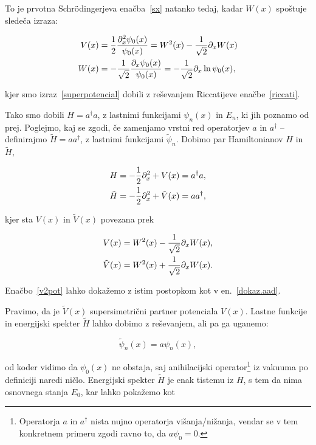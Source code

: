 \ni To je prvotna Schr\" odingerjeva ena\v cba~\eqref{sx} natanko tedaj, kadar $W (x)$ spo\v stuje slede\v ca izraza:

\begin{align}
	V(x) &=\frac{1}{2}\frac{\partial_x^2\psi_0(x)}{\psi_0(x)} = W^2(x) - \frac{1}{\sqrt{2}}\partial_x
		W(x) \label{riccati} \\
	W(x) &= -\frac{1}{\sqrt{2}}\frac{\partial_x\psi_0(x)}{\psi_0(x)} = -\frac{1}{\sqrt{2}} \partial_x \ln \psi_0 (x)\label{superpotencial},
\end{align}

\ni kjer smo izraz~\eqref{superpotencial} dobili z re\v sevanjem Riccatijeve ena\v cbe~\eqref{riccati}.

Tako smo dobili $H = a^\dagger a$, z lastnimi funkcijami $\psi_n(x)$ in $E_n$, ki jih poznamo
od prej. Poglejmo, kaj se zgodi, \v ce zamenjamo vrstni red operatorjev $a$ in $a^\dagger$ -- definirajmo $\tilde{H} = aa^\dagger$,
z lastnimi funkcijami $\tilde{\psi}_n$. Dobimo par Hamiltonianov $H$ in $\tilde{H}$,

\begin{align}
	H &= -\frac{1}{2}\partial_x^2 + V(x) = a^\dagger a, \\
	\tilde{H} &= -\frac{1}{2}\partial_x^2 + \tilde{V}(x) = aa^\dagger,
\end{align}

\ni kjer sta $V(x)$ in $\tilde{V}(x)$ povezana prek

\begin{align}
	V(x) &= W^2(x) - \frac{1}{\sqrt{2}}\partial_x W(x), \notag \\
	\tilde{V}(x) &= W^2(x) + \frac{1}{\sqrt{2}}\partial_x W(x). \label{v2pot}
\end{align}

\ni Ena\v cbo~\eqref{v2pot} lahko doka\v zemo z istim postopkom kot v en.~\eqref{dokaz.aad}.

Pravimo, da je $\tilde{V}(x)$ supersimetri\v cni partner potenciala $V(x)$. Lastne funkcije in energijski spekter $\tilde{H}$
lahko dobimo z re\v sevanjem, ali pa ga uganemo:

\begin{equation}
	\tilde{\psi}_n(x) = a\psi_n(x),
\end{equation}

\ni od koder vidimo da $\psi_0(x)$ ne obstaja, saj anihilacijski operator\footnote{Operatorja $a$ in $a^\dagger$ nista nujno
operatorja vi\v sanja/ni\v zanja, vendar se v tem konkretnem primeru zgodi ravno to, da $a\psi_0 = 0$.} iz vakuuma po definiciji
naredi ni\v clo. Energijski spekter $\tilde{H}$ je enak tistemu iz $H$, s tem da nima osnovnega stanja $E_0$, kar lahko
poka\v zemo kot


